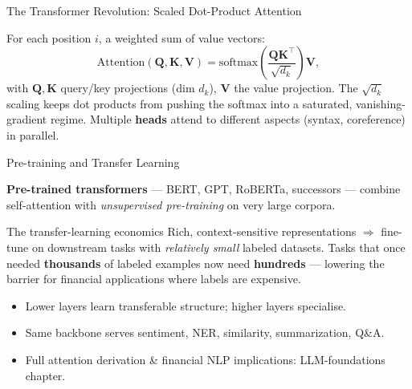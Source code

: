 \documentclass[9pt,t]{beamer}
\begin{document}
\begin{frame}{The Transformer Revolution: Scaled Dot-Product Attention}

\begin{underhood}
For each position $i$, a weighted sum of value vectors:
\[
  \mathrm{Attention}(\mathbf{Q},\mathbf{K},\mathbf{V})
  = \mathrm{softmax}\!\left(\frac{\mathbf{Q}\mathbf{K}^\top}{\sqrt{d_k}}\right)\mathbf{V},
\]
with $\mathbf{Q},\mathbf{K}$ query/key projections (dim $d_k$), $\mathbf{V}$ the
value projection. The $\sqrt{d_k}$ scaling keeps dot products from pushing the
softmax into a saturated, vanishing-gradient regime. Multiple \textbf{heads}
attend to different aspects (syntax, coreference) in parallel.
\end{underhood}
\end{frame}

\begin{frame}{Pre-training and Transfer Learning}

\textbf{Pre-trained transformers} --- BERT, GPT, RoBERTa, successors --- combine
self-attention with \emph{unsupervised pre-training} on very large corpora.

\medskip
\begin{block}{The transfer-learning economics}
Rich, context-sensitive representations $\Rightarrow$ fine-tune on downstream
tasks with \emph{relatively small} labeled datasets. Tasks that once needed
\textbf{thousands} of labeled examples now need \textbf{hundreds} --- lowering the
barrier for financial applications where labels are expensive.
\end{block}

\medskip
\begin{itemize}
  \item Lower layers learn transferable structure; higher layers specialise.
  \item Same backbone serves sentiment, NER, similarity, summarization, Q\&A.
  \item Full attention derivation \& financial NLP implications: LLM-foundations chapter.
\end{itemize}
\end{frame}
\end{document}
